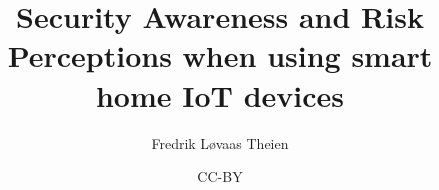 \documentclass[british,titlepage]{ntnuthesis}
\title{Security Awareness and Risk Perceptions when using smart home IoT devices}
\author{Fredrik Løvaas Theien}
\date{CC-BY \ntnuthesisdate}
\begin{document}



\tableofcontents
\listoffigures
\listoftables
\lstlistoflistings






\printbibliography



\appendix

\end{document}
